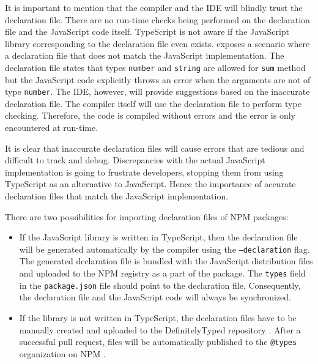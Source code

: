 It is important to mention that the compiler and the IDE will blindly trust the declaration file. There are no run-time checks being performed on the declaration file and the JavaScript code itself. TypeScript is not aware if the JavaScript library corresponding to the declaration file even exists.  exposes a scenario where a declaration file that does not match the JavaScript implementation. The declaration file states that types \texttt{number} and \texttt{string} are allowed for \texttt{sum} method but the JavaScript code explicitly throws an error when the arguments are not of type \texttt{number}. The IDE, however, will provide suggestions based on the inaccurate declaration file. The compiler itself will use the declaration file to perform type checking. Therefore, the code is compiled without errors and the error is only encountered at run-time.



It is clear that inaccurate declaration files will cause errors that are tedious and difficult to track and debug. Discrepancies with the actual JavaScript implementation is going to frustrate developers, stopping them from using TypeScript as an alternative to JavaScript. Hence the importance of accurate declaration files that match the JavaScript implementation.

There are two possibilities for importing declaration files of NPM packages:
\begin{itemize}
	\item If the JavaScript library is written in TypeScript, then the declaration file will be generated automatically by the compiler using the \texttt{--declaration} flag. The generated declaration file is bundled with the JavaScript distribution files and uploaded to the NPM registry as a part of the package. The \texttt{types} field in the \texttt{package.json} file should point to the declaration file. Consequently, the declaration file and the JavaScript code will always be synchronized.
	\item If the library is not written in TypeScript, the declaration files have to be manually created and uploaded to the DefinitelyTyped repository \citep{definitely-typed-repository}. After a successful pull request, files will be automatically published to the \texttt{@types} organization on NPM \citep{types-organization-npm}.
\end{itemize}

